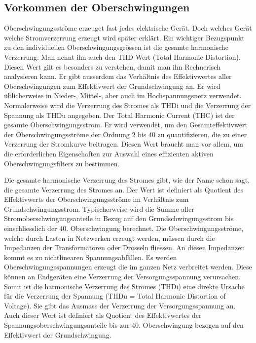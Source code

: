 \subsection{Vorkommen der Oberschwingungen}
Oberschwingungsströme erzeuget fast jedes elektrische Gerät. Doch welches Gerät welche Stromverzerrung erzeugt wird später erklärt. Ein wichtiger Bezugspunkt zu den individuellen Oberschwingungsgrössen ist die gesamte harmonische Verzerrung. Man nennt ihn auch den THD-Wert (Total Harmonic Distortion). Diesen Wert gilt es besonders zu verstehen, damit man ihn Rechnerisch analysieren kann. Er gibt ausserdem das Verhältnis des Effektivwertes aller Oberschwingungen zum Effektivwert der Grundschwingung an. Er wird üblicherweise in Nieder-, Mittel-, aber auch im Hochspannungsnetz verwendet. Normalerweise wird die Verzerrung des Stromes als THDi und die Verzerrung der Spannung als THDu angegeben. Der Total Harmonic Current (THC) ist der gesamte Oberschwingungsstrom. Er wird verwendet, um den Gesamteffektivwert der Oberschwingungsströme der Ordnung 2 bis 40 zu quantifizieren, die zu einer Verzerrung der Stromkurve beitragen. Diesen Wert braucht man vor allem, um die erforderlichen Eigenschaften zur Auswahl eines effizienten aktiven Oberschwingungsfilters zu bestimmen.


Die gesamte harmonische Verzerrung des Stromes gibt, wie der Name schon sagt, die gesamte Verzerrung des Stromes an. Der Wert ist definiert als Quotient des Effektivwerts der Oberschwingungsströme im Verhältnis zum Grundschwingungsstrom. Typischerweise wird die Summe aller Stromoberschwingungsanteile in Bezug auf den Grundschwingungsstrom bis einschliesslich der 40. Oberschwingung berechnet. Die Oberschwingungsströme, welche durch Lasten in Netzwerken erzeugt werden, müssen durch die Impedanzen der Transformatoren oder Drosseln fliessen. An diesen Impedanzen kommt es zu nichtlinearen Spannungsabfällen. Es werden Oberschwingungsspannungen erzeugt die im ganzen Netz verbreitet werden. Diese können an Endgeräten eine Verzerrung der Versorgungsspannung verursachen. Somit ist die harmonische Verzerrung des Stromes (THDi) eine direkte Ursache für die Verzerrung der Spannung (THDu = Total Harmonic Distortion of Voltage). Sie gibt das Ausmass der Verzerrung der Versorgungsspannung an. Auch dieser Wert ist definiert als Quotient des Effektivwertes der Spannungsoberschwingungsanteile bis zur 40. Oberschwingung bezogen auf den Effektivwert der Grundschwingung. 

